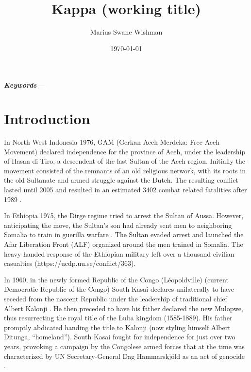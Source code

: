 \documentclass[12pt]{article}
\title{Kappa (working title)}
\author[1]{Marius Swane Wishman}
\affil[1]{Department of Sociology and Political Science, NTNU}
\date{\today}
\providecommand{\keywords}[1]
{
	\small	
	\textbf{\textit{Keywords---}} #1
}
\begin{document}
\maketitle



\begin{abstract}
\end{abstract}

\keywords{}

\pagebreak


\onehalfspacing


\section{Introduction}

In North West Indonesia 1976, GAM (Gerkan Aceh Merdeka: Free Aceh Movement)
declared independence for the province of Aceh, under the leadership of Hasan di
Tiro, a descendent of the last Sultan of the Aceh region. Initially the movement
consisted of the remnants of an old religious network, with its roots in the old
Sultanate and armed struggle against the Dutch. The resulting
conflict lasted until 2005 and resulted in an estimated 3402 combat related
fatalities after 1989 \citep{Aspinall2009, Pettersson2018, Sundberg2013}.

In Ethiopia 1975, the Dirge regime tried to arrest the Sultan of Aussa. However,
anticipating the move, the Sultan's son had already sent men to neighboring
Somalia to train in guerilla warfare \citep{Shehim1985}. The Sultan evaded
arrest and launched the Afar Liberation Front (ALF) organized around the men
trained in Somalia. The heavy handed response of the Ethiopian military left
over a thousand civilian casualties (https://ucdp.uu.se/conflict/363).

In 1960, in the newly formed Republic of the Congo (Léopoldville) (current
Democratic Republic of the Congo) South Kasai declares unilaterally to have
seceded from the nascent Republic under the leadership of traditional chief
Albert Kalonji \citep{Nzongola2002}. He then preceded to have his father
declared the new Mulopwe, thus resurrecting the royal title of the Luba kingdom
(1585-1889). His father promptly abdicated handing the title to Kalonji (now
styling himself Albert Ditunga, ``homeland''). South Kasai fought for independence
for just over two years, provoking a campaign by the Congolese armed forces that
at the time was characterized by UN Secretary-General Dag Hammarskjöld as an act
of genocide \citep{Nzongola2002}.
\end{document}
